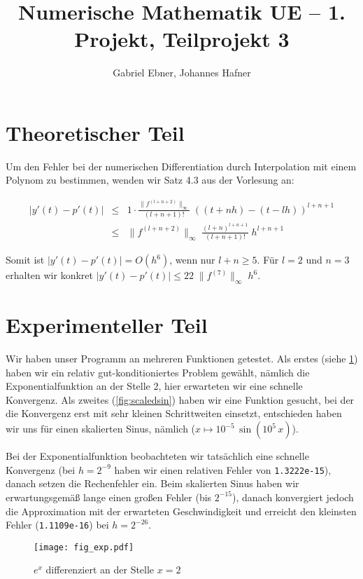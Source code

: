 \documentclass{scrartcl}
\begin{document}
\title{Numerische Mathematik UE -- 1. Projekt, Teilprojekt 3}
\author{Gabriel Ebner, Johannes Hafner}
\maketitle

\section{Theoretischer Teil}

Um den Fehler bei der numerischen Differentiation durch Interpolation mit einem
Polynom zu bestimmen, wenden wir Satz 4.3 aus der Vorlesung an:

\begin{eqnarray*}
|y'(t) - p'(t)| &\leq& 1 \cdot
    \frac{\|f^{(l+n+2)}\|_\infty}{(l+n+1)!}\; ((t+nh) - (t-lh))^{l+n+1} \\
  &\leq& \|f^{(l+n+2)}\|_\infty\; \frac{(l+n)^{l+n+1}}{(l+n+1)!}\; h^{l+n+1}
\end{eqnarray*}

Somit ist \(|y'(t)-p'(t)| = O(h^6)\), wenn nur \(l+n \geq 5\).  Für \(l=2\) und
\(n=3\) erhalten wir konkret \(|y'(t)-p'(t)| \leq 22\; \|f^{(7)}\|_\infty\; h^6\).

\section{Experimenteller Teil}

Wir haben unser Programm an mehreren Funktionen getestet.  Als erstes (siehe
\ref{fig:exp}) haben wir ein relativ gut-konditioniertes Problem gewählt,
nämlich die Exponentialfunktion an der Stelle \(2\), hier erwarteten wir eine
schnelle Konvergenz.  Als zweites (\ref{fig:scaledsin}) haben wir eine Funktion
gesucht, bei der die Konvergenz erst mit sehr kleinen Schrittweiten einsetzt,
entschieden haben wir uns für einen skalierten Sinus, nämlich (\(x \mapsto
10^{-5}\, \sin(10^5\, x)\)).

Bei der Exponentialfunktion beobachteten wir tatsächlich eine schnelle
Konvergenz (bei \(h=2^{-9}\) haben wir einen relativen Fehler von
\verb|1.3222e-15|), danach setzen die Rechenfehler ein.  Beim skalierten Sinus
haben wir erwartungsgemäß lange einen großen Fehler (bis \(2^{-15}\)), danach
konvergiert jedoch die Approximation mit der erwarteten Geschwindigkeit und
erreicht den kleinsten Fehler (\verb|1.1109e-16|) bei \(h=2^{-26}\).

\begin{figure}[!htb]
\centering
\texttt{[image: fig\_exp.pdf]}
\caption{\(e^x\) differenziert an der Stelle \(x=2\)}
\label{fig:exp}
\end{figure}
\end{document}
